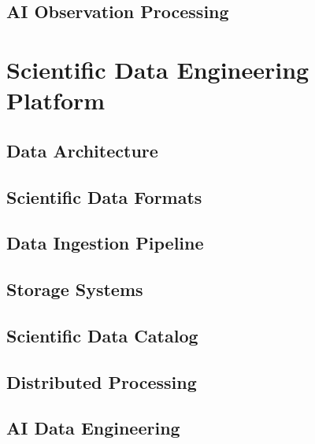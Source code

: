 \documentclass[11pt,a4paper,oneside]{report}
\begin{document}
\chapter{AI Observation Processing}



\part{Scientific Data Engineering Platform}


\chapter{Data Architecture}



\chapter{Scientific Data Formats}



\chapter{Data Ingestion Pipeline}



\chapter{Storage Systems}



\chapter{Scientific Data Catalog}



\chapter{Distributed Processing}



\chapter{AI Data Engineering}

\end{document}

